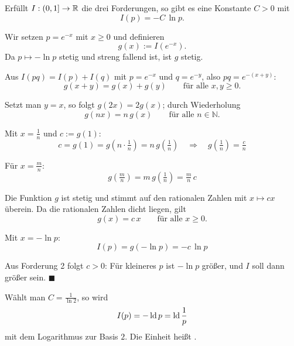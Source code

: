 \begin{merksatz}
Erfüllt $I:(0,1] \to \mathbb{R}$ die drei Forderungen, so gibt es eine Konstante $C > 0$ mit
\[ I(p) = -C\,\ln p . \]

Wir setzen $p = e^{-x}$ mit $x \ge 0$ und definieren
\[ g(x) := I(e^{-x}) . \]
Da $p \mapsto -\ln p$ stetig und streng fallend ist, ist $g$ stetig.

Aus $I(pq) = I(p)+I(q)$ mit $p = e^{-x}$ und $q = e^{-y}$, also $pq = e^{-(x+y)}$:
\[ g(x+y) = g(x) + g(y) \qquad\text{für alle } x,y \ge 0 . \]

Setzt man $y = x$, so folgt $g(2x) = 2g(x)$; durch Wiederholung
\[ g(nx) = n\,g(x) \qquad\text{für alle } n \in \mathbb{N} . \]

Mit $x = \frac{1}{n}$ und $c := g(1)$:
\[ c = g(1) = g\left(n\cdot\tfrac1n\right) = n\,g\left(\tfrac1n\right) \quad\Longrightarrow\quad g\left(\tfrac1n\right) = \tfrac{c}{n} \]

Für $x = \frac{m}{n}$:
\[ g\left(\tfrac{m}{n}\right) = m\,g\left(\tfrac1n\right) = \tfrac{m}{n}\,c \]

Die Funktion $g$ ist stetig und stimmt auf den rationalen Zahlen mit $x \mapsto cx$ überein. Da die rationalen Zahlen dicht liegen, gilt
\[ g(x) = c\,x \qquad\text{für alle } x \ge 0 . \]

Mit $x = -\ln p$:
\[ I(p) = g(-\ln p) = -c\,\ln p \]

Aus Forderung 2 folgt $c > 0$: Für kleineres $p$ ist $-\ln p$ größer, und $I$ soll dann größer sein. $\blacksquare$

\begin{center}
\begin{minipage}{0.88\textwidth}
\end{minipage}
\end{center}
\end{merksatz}

\begin{definition}
Wählt man $C = \frac{1}{\ln 2}$, so wird
\[ I(p) = -\operatorname{ld} p = \operatorname{ld}\frac1p \]
mit dem Logarithmus zur Basis $2$. Die Einheit heißt .
\end{definition}

